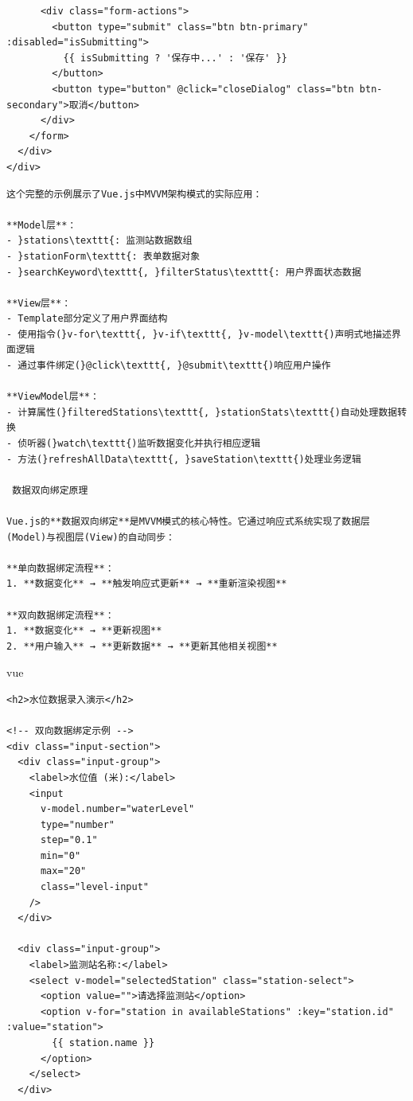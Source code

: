 {{\begin{verbatim}
      <div class="form-actions">
        <button type="submit" class="btn btn-primary" :disabled="isSubmitting">
          {{ isSubmitting ? '保存中...' : '保存' }}
        </button>
        <button type="button" @click="closeDialog" class="btn btn-secondary">取消</button>
      </div>
    </form>
  </div>
</div>
\end{verbatim}

\begin{lstlisting}
这个完整的示例展示了Vue.js中MVVM架构模式的实际应用：

**Model层**：
- }stations\texttt{: 监测站数据数组
- }stationForm\texttt{: 表单数据对象
- }searchKeyword\texttt{, }filterStatus\texttt{: 用户界面状态数据

**View层**：
- Template部分定义了用户界面结构
- 使用指令(}v-for\texttt{, }v-if\texttt{, }v-model\texttt{)声明式地描述界面逻辑
- 通过事件绑定(}@click\texttt{, }@submit\texttt{)响应用户操作

**ViewModel层**：
- 计算属性(}filteredStations\texttt{, }stationStats\texttt{)自动处理数据转换
- 侦听器(}watch\texttt{)监听数据变化并执行相应逻辑
- 方法(}refreshAllData\texttt{, }saveStation\texttt{)处理业务逻辑

 数据双向绑定原理

Vue.js的**数据双向绑定**是MVVM模式的核心特性。它通过响应式系统实现了数据层(Model)与视图层(View)的自动同步：

**单向数据绑定流程**：
1. **数据变化** → **触发响应式更新** → **重新渲染视图**

**双向数据绑定流程**：
1. **数据变化** → **更新视图**
2. **用户输入** → **更新数据** → **更新其他相关视图**
\end{lstlisting}

vue

\begin{verbatim}
<h2>水位数据录入演示</h2>

<!-- 双向数据绑定示例 -->
<div class="input-section">
  <div class="input-group">
    <label>水位值 (米):</label>
    <input 
      v-model.number="waterLevel" 
      type="number" 
      step="0.1"
      min="0"
      max="20"
      class="level-input"
    />
  </div>
  
  <div class="input-group">
    <label>监测站名称:</label>
    <select v-model="selectedStation" class="station-select">
      <option value="">请选择监测站</option>
      <option v-for="station in availableStations" :key="station.id" :value="station">
        {{ station.name }}
      </option>
    </select>
  </div>
  

\end{verbatim}}}
